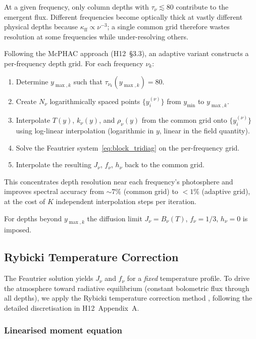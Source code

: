 At a given frequency, only column depths with $\tau_\nu \lesssim 80$ contribute to the emergent flux. Different frequencies become optically thick at vastly different physical depths because $\kappa_\mathrm{ff}\propto\nu^{-3}$; a single common grid therefore wastes resolution at some frequencies while under-resolving others.

Following the McPHAC approach (H12~\S3.3), an adaptive variant constructs a per-frequency depth grid. For each frequency $\nu_k$:
\begin{enumerate}
  \item Determine $y_{\max,k}$ such that $\tau_{\nu_k}(y_{\max,k})=80$.
  \item Create $N_\nu$ logarithmically spaced points $\{y^{(\nu)}_i\}$ from $y_\mathrm{min}$ to $y_{\max,k}$.
  \item Interpolate $T(y)$, $k_\nu(y)$, and $\rho_\nu(y)$ from the common grid onto $\{y^{(\nu)}_i\}$ using log-linear interpolation (logarithmic in $y$, linear in the field quantity).
  \item Solve the Feautrier system~\eqref{eq:block_tridiag} on the per-frequency grid.
  \item Interpolate the resulting $J_\nu$, $f_\nu$, $h_\nu$ back to the common grid.
\end{enumerate}
This concentrates depth resolution near each frequency's photosphere and improves spectral accuracy from ${\sim}7\%$ (common grid) to ${<}1\%$ (adaptive grid), at the cost of $K$ independent interpolation steps per iteration.

For depths beyond $y_{\max,k}$ the diffusion limit $J_\nu = B_\nu(T)$, $f_\nu = 1/3$, $h_\nu = 0$ is imposed.

\subsection{Rybicki Temperature Correction}
\label{sec:rybicki}

The Feautrier solution yields $J_\nu$ and $f_\nu$ for a \emph{fixed} temperature profile. To drive the atmosphere toward radiative equilibrium (constant bolometric flux through all depths), we apply the Rybicki temperature correction method \citep{rybicki1971}, following the detailed discretisation in H12~Appendix~A.

\subsubsection{Linearised moment equation}

